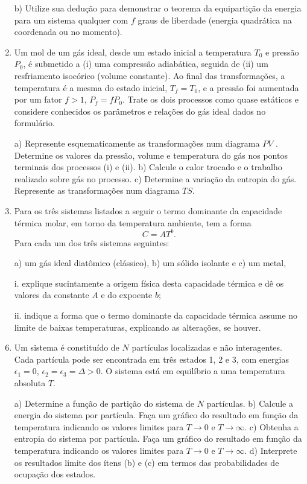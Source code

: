 \begin{enumerate}[start=1,label={\bfseries Q\arabic*.}]
  b) Utilize sua dedução para demonstrar o teorema da equipartição da energia para um sistema qualquer com $f$ graus de liberdade (energia quadrática na coordenada ou no momento).




\item Um mol de um gás ideal, desde um estado inicial a temperatura $T_{0}$ e pressão $P_{0}$, é submetido a (i) uma compressão adiabática, seguida de (ii) um resfriamento isocórico (volume constante). Ao final das transformações, a temperatura é a mesma do estado inicial, $T_{f} = T_{0}$, e a pressão foi aumentada por um fator $f > 1$, $P_{f} = f P_{0}$. Trate os dois processos como quase estáticos e considere conhecidos os parâmetros e relações do gás ideal dados no formulário.

a) Represente esquematicamente as transformações num diagrama $PV$ . Determine os valores da pressão, volume e temperatura do gás nos pontos terminais dos processos (i) e (ii).
b) Calcule o calor trocado e o trabalho realizado sobre gás no processo.
c) Determine a variação da entropia do gás. Represente as transformações num diagrama $TS$.




\item Para os três sistemas listados a seguir o termo dominante da capacidade térmica molar, em torno da temperatura ambiente, tem a forma
$$
C = AT^{b}.
$$
Para cada um dos três sistemas seguintes:

a) um gás ideal diatômico (clássico),
b) um sólido isolante e
c) um metal,
\item[i.] explique sucintamente a origem física desta capacidade térmica e dê os valores da constante $A$ e do expoente $b$;
\item[ii.] indique a forma que o termo dominante da capacidade térmica assume no limite de baixas temperaturas, explicando as alterações, se houver.





\item Um sistema é constituído de $N$ partículas localizadas e não interagentes. Cada partícula pode ser encontrada em três estados 1, 2 e 3, com energias $\epsilon_{1} = 0$, $\epsilon_{2} = \epsilon_{3} = \Delta > 0$. O sistema está em equilíbrio a uma temperatura absoluta $T$.

a) Determine a função de partição do sistema de $N$ partículas.
b) Calcule a energia do sistema por partícula. Faça um gráfico do resultado em função da temperatura indicando os valores limites para $T \rightarrow 0$ e $T \rightarrow \infty$.
c) Obtenha a entropia do sistema por partícula. Faça um gráfico do resultado em função da temperatura indicando os valores limites para $T \rightarrow 0$ e $T \rightarrow \infty$.
d) Interprete os resultados limite dos ítens (b) e (c) em termos das probabilidades de ocupação dos estados.




\end{enumerate}
